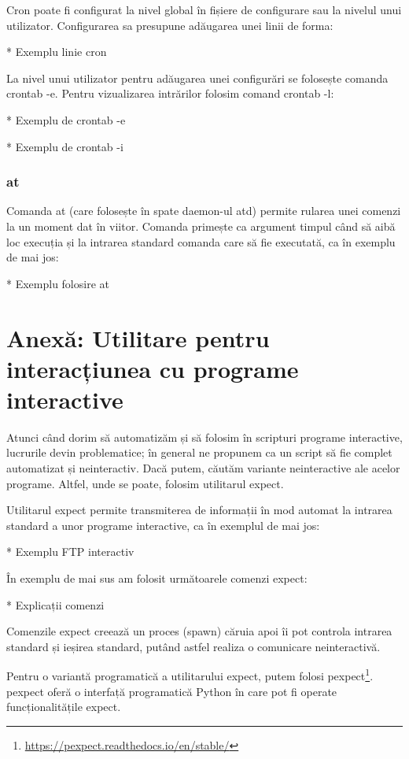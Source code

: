 Cron poate fi configurat la nivel global în fișiere de configurare sau la
nivelul unui utilizator. Configurarea sa presupune adăugarea unei linii de
forma:

* Exemplu linie cron

La nivel unui utilizator pentru adăugarea unei configurări se folosește comanda
crontab -e. Pentru vizualizarea intrărilor folosim comand crontab -l:

* Exemplu de crontab -e

* Exemplu de crontab -i

\subsubsection{at}
\label{sec:script-infosys-planning-at}

Comanda at (care folosește în spate daemon-ul atd) permite rularea unei comenzi
la un moment dat în viitor. Comanda primește ca argument timpul când să aibă loc
execuția și la intrarea standard comanda care să fie executată, ca în exemplu de
mai jos:

* Exemplu folosire at

\section{Anexă: Utilitare pentru interacțiunea cu programe interactive}
\label{sec:script-gui}

Atunci când dorim să automatizăm și să folosim în scripturi programe
interactive, lucrurile devin problematice; în general ne propunem ca un script
să fie complet automatizat și neinteractiv. Dacă putem, căutăm variante
neinteractive ale acelor programe. Altfel, unde se poate, folosim utilitarul
expect.

Utilitarul expect permite transmiterea de informații în mod automat la intrarea
standard a unor programe interactive, ca în exemplul de mai jos:

* Exemplu FTP interactiv

În exemplu de mai sus am folosit următoarele comenzi expect:

* Explicații comenzi

Comenzile expect creează un proces (spawn) căruia apoi îi pot controla intrarea
standard și ieșirea standard, putând astfel realiza o comunicare neinteractivă.

Pentru o variantă programatică a utilitarului expect, putem folosi
pexpect\footnote{\url{https://pexpect.readthedocs.io/en/stable/}}. pexpect
oferă o interfață programatică Python în care pot fi operate funcționalitățile
expect.

